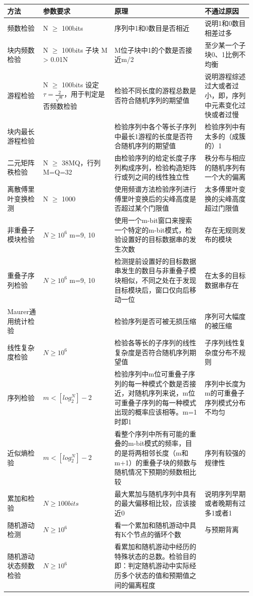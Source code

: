 \documentclass[master]{seuthesis} %
\begin{document}
\begin{Main}
\begin{table}[]
    \centering
    \begin{tabular}{p{70pt}p{70pt}p{200pt}p{100pt}}
    \hline
    方法 & 参数要求 & 原理 & 不通过原因 \\ \hline
    频数检验 & N $\geq$ 100bits & 序列中1和0数目是否相近 & 说明1和0数目相差过多  \\ \hline
    块内频数检验 & N $\geq$ 100bits 子块 M > 0.01N & M位子块中1的个数是否接近m/2 & 至少某一个子块0、1比例不均衡 \\ \hline
    游程检验 & N $\geq$ 100bits 设定$\tau = \frac{2}{\sqrt{n}}$，用于判定是否频数检验 & 检验不同长度的游程总数是否符合随机序列的期望值 & 说明游程综述过大或者过小，即，序列中元素变化过快或者过慢  \\ \hline
    块内最长游程检验 &  & 检验序列中各个等长子序列中最长1游程的长度是否符合随机序列的期望值 & 检验序列中有太多的（成簇的）1 \\ \hline
    二元矩阵秩检验 & N $\geq$ 38MQ，行列M=Q=32 & 由检验序列的给定长度子序列构成序列，检验构造矩阵行或列之间的线性独立性 & 秩分布与相应的随机序列有一个大的偏离 \\ \hline
    离散傅里叶变换检测 & N $\geq$ 1000 & 使用频谱方法检验序列进行傅里叶变换后的尖峰高度是否超过某个门限值 & 太多傅里叶变换的尖峰高度超过门限值 \\ \hline
    非重叠子模块检验 & $ N \geq 10^6$  m={9, 10} & 使用一个m-bit窗口来搜索一个特定的m-bit模式，检验设置好的目标数据串的发生次数 & 存在无规则发布的模块 \\ \hline
    重叠子序列检验 & $N \geq 10^6$ m={9, 10} & 检测提前设置好的目标数据串发生的数目与非重叠子模块相似，不同之处在于发现目标模块后，窗口仅向后移动一位 & 在太多的目标数据串存在 \\ \hline
    Maurer通用统计检验 & & 检验序列是否可被无损压缩 & 序列可大幅度的被压缩 \\ \hline
    线性复杂度检验 & $N \geq 10^6$ & 检验各等长的子序列的线性复杂度是否符合随机序列期望值 & 子序列线性复杂度分布不规则 \\ \hline
    序列检验 & $ m < [log_2^N] - 2$ & 检验序列中m位可重叠子序列的每一种模式个数是否接近，对随机序列来说，m位可重叠子序列的每一种模式出现的概率应该相等。m=1时即1 & 序列中长度为m的可重叠子序列模式分布不均匀 \\ \hline
    近似熵检验 & $ m < [log_2^N] - 2$ & 看整个序列中所有可能的重叠的m-bit模式的频率，目的是将两相邻长度（m和m+1）的重叠子块的频数与随机情况下预期的频数相比较 & 序列有较强的规律性 \\ \hline
    累加和检验 & $N \geq 100bits$ & 最大累加与随机序列中具有的最大偏移相比较，应该接近0 & 说明序列早期或者晚期有过多1或者1 \\ \hline
    随机游动检测 & $N \geq 10^6$ & 看一个累加和随机游动中具有K个节点的循环个数 & 与预期背离 \\ \hline
    随机游动状态频数检验 & $N \geq 10^6 $ & 看累加和随机游动中经历的特殊状态的总数。检验目的即：判定随机游动中实际经历多个状态的值和预期值之间的偏离程度 \\ \hline


\end{tabular}
\end{table}
\end{Main}
\end{document}
